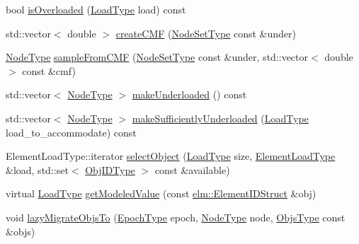 \begin{DoxyCompactItemize}
\item 
bool \hyperlink{structvt_1_1vrt_1_1collection_1_1lb_1_1_tempered_l_b_ab737fad35804f7a6db9ae67a7a5fa982}{is\+Overloaded} (\hyperlink{namespacevt_a8fb51741340b87d7aaee0bef60e9896b}{Load\+Type} load) const
\item 
std\+::vector$<$ double $>$ \hyperlink{structvt_1_1vrt_1_1collection_1_1lb_1_1_tempered_l_b_add46961d85ddad906cfd66aba09a0bd1}{create\+C\+MF} (\hyperlink{structvt_1_1vrt_1_1collection_1_1lb_1_1_tempered_l_b_aa18a0edaf10119e307e7209371caa673}{Node\+Set\+Type} const \&under)
\item 
\hyperlink{namespacevt_a866da9d0efc19c0a1ce79e9e492f47e2}{Node\+Type} \hyperlink{structvt_1_1vrt_1_1collection_1_1lb_1_1_tempered_l_b_a674736589bb2c1cadba7516e0bf598b9}{sample\+From\+C\+MF} (\hyperlink{structvt_1_1vrt_1_1collection_1_1lb_1_1_tempered_l_b_aa18a0edaf10119e307e7209371caa673}{Node\+Set\+Type} const \&under, std\+::vector$<$ double $>$ const \&cmf)
\item 
std\+::vector$<$ \hyperlink{namespacevt_a866da9d0efc19c0a1ce79e9e492f47e2}{Node\+Type} $>$ \hyperlink{structvt_1_1vrt_1_1collection_1_1lb_1_1_tempered_l_b_af3c49d726cab946d817f87ee94b417a2}{make\+Underloaded} () const
\item 
std\+::vector$<$ \hyperlink{namespacevt_a866da9d0efc19c0a1ce79e9e492f47e2}{Node\+Type} $>$ \hyperlink{structvt_1_1vrt_1_1collection_1_1lb_1_1_tempered_l_b_a946bd9c5a6591f8494ecd11be5092ef0}{make\+Sufficiently\+Underloaded} (\hyperlink{namespacevt_a8fb51741340b87d7aaee0bef60e9896b}{Load\+Type} load\+\_\+to\+\_\+accommodate) const
\item 
Element\+Load\+Type\+::iterator \hyperlink{structvt_1_1vrt_1_1collection_1_1lb_1_1_tempered_l_b_a191c3b0d3f7a06de4510b1c3370eabc2}{select\+Object} (\hyperlink{namespacevt_a8fb51741340b87d7aaee0bef60e9896b}{Load\+Type} size, \hyperlink{structvt_1_1vrt_1_1collection_1_1lb_1_1_base_l_b_adfae019ae1d55a6bf4f080f9b455fca4}{Element\+Load\+Type} \&load, std\+::set$<$ \hyperlink{structvt_1_1vrt_1_1collection_1_1lb_1_1_base_l_b_a790b22acf448880599724749cdc4e9b3}{Obj\+I\+D\+Type} $>$ const \&available)
\item 
virtual \hyperlink{namespacevt_a8fb51741340b87d7aaee0bef60e9896b}{Load\+Type} \hyperlink{structvt_1_1vrt_1_1collection_1_1lb_1_1_tempered_l_b_a2a6dd8bb28b45be1dc6a35d9f8bb0b68}{get\+Modeled\+Value} (const \hyperlink{structvt_1_1elm_1_1_element_i_d_struct}{elm\+::\+Element\+I\+D\+Struct} \&obj)
\item 
void \hyperlink{structvt_1_1vrt_1_1collection_1_1lb_1_1_tempered_l_b_a00af3637cea1d345fea518d2608d5596}{lazy\+Migrate\+Objs\+To} (\hyperlink{namespacevt_a81d11b28122d43bf9834577e4a06440f}{Epoch\+Type} epoch, \hyperlink{namespacevt_a866da9d0efc19c0a1ce79e9e492f47e2}{Node\+Type} node, \hyperlink{structvt_1_1vrt_1_1collection_1_1lb_1_1_tempered_l_b_ad54faf59319f1b33dec689ee853d688e}{Objs\+Type} const \&objs)

\end{DoxyCompactItemize}
